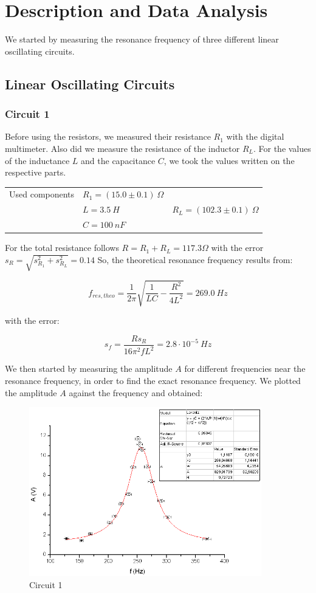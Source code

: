 \section{Description and Data Analysis}

We started by measuring the resonance frequency of three different linear oscillating circuits.

\subsection{Linear Oscillating Circuits}

\subsubsection{Circuit 1}

Before using the resistors, we measured their resistance $R_1$ with the digital multimeter. Also did we measure the resistance of the inductor $R_L$. For the values of the inductance $L$ and the capacitance $C$, we took the values written on the respective parts.

\begin{tabular}{l l l}
Used components & $R_1 = (15.0 \pm 0.1)\ \Omega$ & \\
 & $L=3.5\ H$ & $R_L = (102.3 \pm 0.1)\ \Omega$\\
 & $C=100\ nF$ & \\
\end{tabular}

For the total resistance follows $R = R_1 + R_L = 117.3 \Omega$ with the error $s_R = \sqrt{s_{R_1}^2 + s_{R_L}^2} = 0.14$ 
So, the theoretical resonance frequency results from:

$$f_{res,theo} = \frac{1}{2\pi}\sqrt{\frac{1}{LC}-\frac{R^2}{4L^2}} = 269.0\ Hz$$

with the error:

$$s_f = \frac{Rs_R}{16\pi^2fL^2} = 2.8\cdot 10^{-5}\ Hz$$

We then started by measuring the amplitude $A$ for different frequencies near the resonance frequency, in order to find the exact resonance frequency. We plotted the amplitude $A$ against the frequency and obtained:

\begin{figure}[H]
\centering \includegraphics[width=0.9\textwidth]{Bilder/1a.png}
\caption{Circuit 1}
\end{figure}

